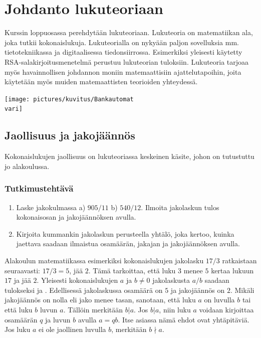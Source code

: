 \chapter{Johdanto lukuteoriaan}

Kurssin loppuosassa perehdytään lukuteoriaan. Lukuteoria on matematiikan ala, joka tutkii kokonaislukuja. Lukuteorialla on nykyään paljon sovelluksia mm. tietotekniikassa ja digitaalisessa tiedonsiirrossa. Esimerkiksi yleisesti käytetty RSA-sala\-kir\-joi\-tus\-me\-ne\-tel\-mä perustuu lukuteorian tuloksiin. Lukuteoria tarjoaa myös havainnollisen johdannon moniin matemaattisiin ajattelutapoihin, joita käytetään myös muiden matemaattisten teorioiden yhteydessä.

\begin{center}
\texttt{[image: pictures/kuvitus/Bankautomat\\vari]}
\end{center}


\section{Jaollisuus ja jakojäännös}
\label{jaollisuus}
Kokonaislukujen jaollisuus on lukuteoriassa keskeinen käsite, johon on tutustuttu jo alakoulussa.

\subsection*{Tutkimustehtävä} %
\begin{enumerate}
\item
Laske jakokulmassa a) $905 / 11$ b) $540 / 12$. Ilmoita jakolaskun tulos kokonaisosan ja jakojäännöksen avulla.
\item
Kirjoita kummankin jakolaskun perusteella yhtälö, joka kertoo, kuinka jaettava saadaan
ilmaistua osamäärän, jakajan ja jakojäännöksen avulla.
\end{enumerate}


Alakoulun matematiikassa esimerkiksi kokonaislukujen jakolasku $17/3$ ratkaistaan seuraavasti: $17/3 = 5$, jää $2$. Tämä tarkoittaa, että luku $3$ menee $5$ kertaa lukuun $17$ ja jää $2$. Yleisesti kokonaislukujen $a$ ja $b \neq 0$ jakolaskusta $a/b$ saadaan tulokseksi  ja . Edellisessä jakolaskussa osamäärä on $5$ ja jakojäännös on $2$. Mikäli jakojäännös on nolla eli jako menee tasan, sanotaan, että luku $a$ on  luvulla $b$ tai että luku $b$  luvun $a$. Tällöin merkitään $b|a$. Jos $b|a$, niin luku $a$ voidaan kirjoittaa osamäärän $q$ ja luvun $b$ avulla $a = qb$. Itse asiassa nämä ehdot ovat yhtäpitäviä. Jos luku $a$ ei ole jaollinen luvulla $b$, merkitään $b \nmid a$.

